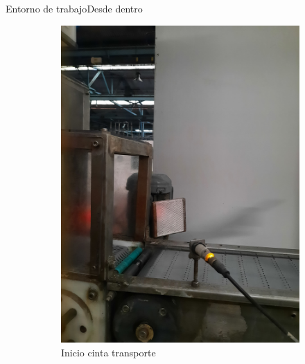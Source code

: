 \documentclass{beamer}
\begin{document}
\begin{frame}{Entorno de trabajo}{Desde dentro}
\begin{figure}
\begin{subfigure}[t]{0.3\textwidth}
\centering
  \includegraphics[width = \textwidth, angle=270]{img/closeup}
  \caption{Inicio cinta transporte}
  \label{fig:inicio}
\end{subfigure}\hfill
\begin{subfigure}[t]{0.3\textwidth}
\centering

\end{subfigure}
\end{figure}
\end{frame}
\end{document}
